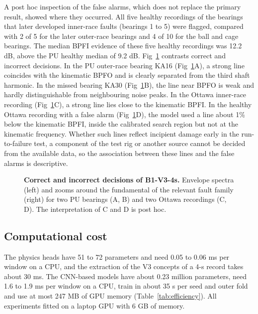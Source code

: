 \documentclass[10pt,letterpaper]{article}
\begin{document}
A post hoc inspection of the false alarms, which does not replace the primary result, showed where they occurred. All five healthy recordings of the bearings that later developed inner-race faults (bearings 1 to 5) were flagged, compared with 2 of 5 for the later outer-race bearings and 4 of 10 for the ball and cage bearings. The median BPFI evidence of these five healthy recordings was 12.2 dB, above the PU healthy median of 9.2 dB. Fig~\ref{fig8} contrasts correct and incorrect decisions. In the PU outer-race bearing KA16 (Fig~\ref{fig8}A), a strong line coincides with the kinematic BPFO and is clearly separated from the third shaft harmonic. In the missed bearing KA30 (Fig~\ref{fig8}B), the line near BPFO is weak and hardly distinguishable from neighbouring noise peaks. In the Ottawa inner-race recording (Fig~\ref{fig8}C), a strong line lies close to the kinematic BPFI. In the healthy Ottawa recording with a false alarm (Fig~\ref{fig8}D), the model used a line about 1\% below the kinematic BPFI, inside the calibrated search region but not at the kinematic frequency. Whether such lines reflect incipient damage early in the run-to-failure test, a component of the test rig or another source cannot be decided from the available data, so the association between these lines and the false alarms is descriptive.

\begin{figure}[!h]
\caption{\textbf{Correct and incorrect decisions of B1-V3-4s.} Envelope spectra (left) and zooms around the fundamental of the relevant fault family (right) for two PU bearings (A, B) and two Ottawa recordings (C, D). The interpretation of C and D is post hoc.}
\label{fig8}
\end{figure}

\subsection*{Computational cost}
The physics heads have 51 to 72 parameters and need 0.05 to 0.06 ms per window on a CPU, and the extraction of the V3 concepts of a 4-s record takes about 30 ms. The CNN-based models have about 0.23 million parameters, need 1.6 to 1.9 ms per window on a CPU, train in about 35 s per seed and outer fold and use at most 247 MB of GPU memory (Table~\ref{tab:efficiency}). All experiments fitted on a laptop GPU with 6 GB of memory.
\end{document}

